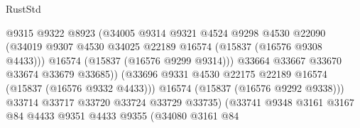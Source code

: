 \begin{lexlean}{RustStd}
\begin{coremodule}
{\begin{coremodule}
{{{{{{{{{{{{{{{{{{{{{{{{{{{{{{{{{{{{{{{{{{{{{{{{{{{{{{{{{{{{                                            @9315
                                            @9322
                                            @8923
                                            (@34005
                                              @9314
                                              @9321
                                              @4524
                                              @9298
                                              @4530
                                              @22090
                                              (@34019
                                                @9307
                                                @4530
                                                @34025
                                                @22189
                                                @16574
                                                (@15837 (@16576 @9308 @4433)))
                                              @16574
                                              (@15837 (@16576 @9299 @9314)))
                                            @33664
                                            @33667
                                            @33670
                                            @33674
                                            @33679
                                            @33685))
                                        (@33696
                                          @9331
                                          @4530
                                          @22175
                                          @22189
                                          @16574
                                          (@15837 (@16576 @9332 @4433)))
                                        @16574
                                        (@15837 (@16576 @9292 @9338)))
                                      @33714
                                      @33717
                                      @33720
                                      @33724
                                      @33729
                                      @33735)
                                    (@33741
                                      @9348
                                      @3161
                                      @3167
                                      @84
                                      @4433
                                      @9351
                                      @4433
                                      @9355
                                      (@34080
                                        @3161
                                        @84
}}}}}}}}}}}}}}}}}}}}}}}}}}}}}}}}}}}}}}}}}}}}}}}}}}}}}}}}}}}}
\end{coremodule}}
\end{coremodule}
\end{lexlean}
